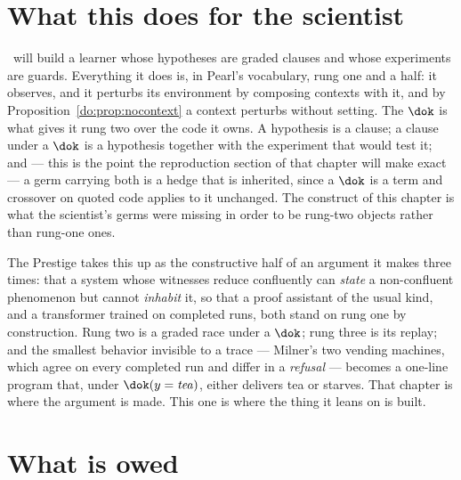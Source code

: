 \section{What this does for the scientist}
\label{do:sec:scientist}

\chSci\ will build a learner whose hypotheses are graded clauses and whose experiments are guards.
Everything it does is, in Pearl's vocabulary, rung one and a half: it observes, and it perturbs
its environment by composing contexts with it, and by Proposition~\ref{do:prop:nocontext} a
context perturbs without setting. The $\dok$ is what gives it rung two over the code it owns. A
hypothesis is a clause; a clause under a $\dok$ is a hypothesis together with the experiment that
would test it; and --- this is the point the reproduction section of that chapter will make
exact --- a germ carrying both is a hedge that is inherited, since a $\dok$ is a term and
crossover on quoted code applies to it unchanged. The construct of this chapter is what the
scientist's germs were missing in order to be rung-two objects rather than rung-one ones.

The Prestige takes this up as the constructive half of an argument it makes three times: that a
system whose witnesses reduce confluently can \emph{state} a non-confluent phenomenon but cannot
\emph{inhabit} it, so that a proof assistant of the usual kind, and a transformer trained on
completed runs, both stand on rung one by construction. Rung two is a graded race under a $\dok$;
rung three is its replay; and the smallest behavior invisible to a trace --- Milner's two vending
machines, which agree on every completed run and differ in a \emph{refusal} --- becomes a one-line
program that, under $\dok(y = \mathit{tea})$, either delivers tea or starves. That chapter is
where the argument is made. This one is where the thing it leans on is built.

\section{What is owed}
\label{do:sec:open}

